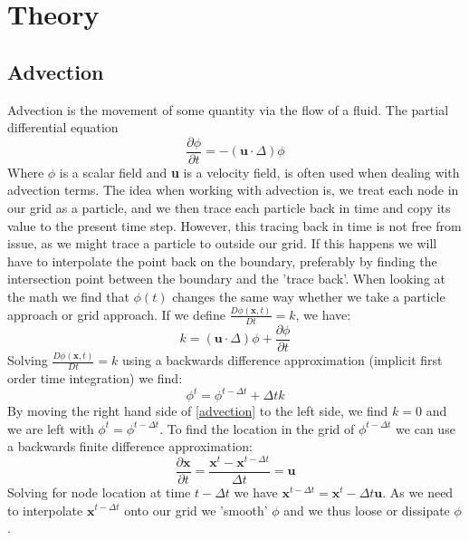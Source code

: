 \section{Theory}
\subsection{Advection}
Advection is the movement of some quantity via the flow of a fluid. The partial differential equation
\begin{equation}\label{advection}
	\frac{\partial \phi}{\partial t} = -(\mathbf{u}\cdot \Delta)\phi
\end{equation}
Where $\phi$ is a scalar field and \textbf{u} is a velocity field, is often used when dealing with advection terms. The idea when working with advection is, we treat each node in our grid as a particle, and we then trace each particle back in time and copy its value to the present time step. However, this tracing back in time is not free from issue, as we might trace a particle to outside our grid. If this happens we will have to interpolate the point back on the boundary, preferably by finding the intersection point between the boundary and the 'trace back'. When looking at the math we find that $\phi(t)$ changes the same way whether we take a particle approach or grid approach. If we define $\frac{D\phi(\mathbf{x}, t)}{Dt} = k$, we have:
\begin{equation*}
	k = (\mathbf{u}\cdot \Delta)\phi + \frac{\partial \phi}{\partial t}
\end{equation*}
Solving $\frac{D\phi(\mathbf{x}, t)}{Dt} = k$ using a backwards difference approximation (implicit first order time integration) we find:
\begin{equation*}
	\phi^t = \phi^{t-\Delta t}+\Delta tk
\end{equation*}
By moving the right hand side of \autoref{advection} to the left side, we find $k = 0$ and we are left with $\phi^t = \phi^{t-\Delta t}$. To find the location in the grid of $\phi^{t-\Delta t}$ we can use a backwards finite difference approximation:
\begin{equation*}
	\frac{\partial \mathbf{x}}{\partial t} = \frac{\mathbf{x}^t - \mathbf{x}^{t-\Delta t}}{\Delta t} = \mathbf{u}
\end{equation*}
Solving for node location at time $t - \Delta t$ we have $\mathbf{x}^{t-\Delta t} = \mathbf{x}^t-\Delta t\mathbf{u}$. As we need to interpolate $\mathbf{x}^{t-\Delta t}$ onto our grid we 'smooth' $\phi$ and we thus loose or dissipate $\phi$.

